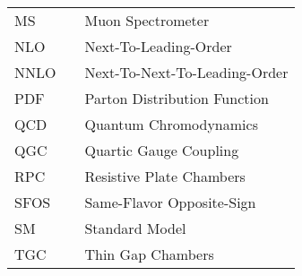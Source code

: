   \begin{tabular}{lp{}p{}}
    MS          & \dotfill & Muon Spectrometer \\
    NLO         & \dotfill & Next-To-Leading-Order \\
    NNLO         & \dotfill & Next-To-Next-To-Leading-Order \\
    PDF         & \dotfill & Parton Distribution Function \\
    QCD         & \dotfill & Quantum Chromodynamics \\
    QGC         & \dotfill & Quartic Gauge Coupling \\
    RPC         & \dotfill & Resistive Plate Chambers \\
    SFOS        & \dotfill & Same-Flavor Opposite-Sign \\
    SM          & \dotfill & Standard Model  \\
    TGC         & \dotfill & Thin Gap Chambers \\

  \end{tabular}


